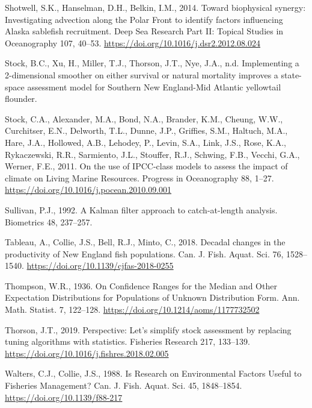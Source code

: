 \documentclass[]{article}
\begin{document}
\leavevmode\hypertarget{ref-shotwell2014Biophysical}{}%
Shotwell, S.K., Hanselman, D.H., Belkin, I.M., 2014. Toward biophysical
synergy: Investigating advection along the Polar Front to identify
factors influencing Alaska sablefish recruitment. Deep Sea Research Part
II: Topical Studies in Oceanography 107, 40--53.
\url{https://doi.org/10.1016/j.dsr2.2012.08.024}

\leavevmode\hypertarget{ref-stockthisissueImplementing}{}%
Stock, B.C., Xu, H., Miller, T.J., Thorson, J.T., Nye, J.A., n.d.
Implementing a 2-dimensional smoother on either survival or natural
mortality improves a state-space assessment model for Southern New
England-Mid Atlantic yellowtail flounder.

\leavevmode\hypertarget{ref-stock2011Use}{}%
Stock, C.A., Alexander, M.A., Bond, N.A., Brander, K.M., Cheung, W.W.,
Curchitser, E.N., Delworth, T.L., Dunne, J.P., Griffies, S.M., Haltuch,
M.A., Hare, J.A., Hollowed, A.B., Lehodey, P., Levin, S.A., Link, J.S.,
Rose, K.A., Rykaczewski, R.R., Sarmiento, J.L., Stouffer, R.J., Schwing,
F.B., Vecchi, G.A., Werner, F.E., 2011. On the use of IPCC-class models
to assess the impact of climate on Living Marine Resources. Progress in
Oceanography 88, 1--27.
\url{https://doi.org/10.1016/j.pocean.2010.09.001}

\leavevmode\hypertarget{ref-sullivan1992Kalman}{}%
Sullivan, P.J., 1992. A Kalman filter approach to catch-at-length
analysis. Biometrics 48, 237--257.

\leavevmode\hypertarget{ref-tableau2018Decadal}{}%
Tableau, A., Collie, J.S., Bell, R.J., Minto, C., 2018. Decadal changes
in the productivity of New England fish populations. Can. J. Fish.
Aquat. Sci. 76, 1528--1540.
\url{https://doi.org/10.1139/cjfas-2018-0255}

\leavevmode\hypertarget{ref-thompson1936Confidence}{}%
Thompson, W.R., 1936. On Confidence Ranges for the Median and Other
Expectation Distributions for Populations of Unknown Distribution Form.
Ann. Math. Statist. 7, 122--128.
\url{https://doi.org/10.1214/aoms/1177732502}

\leavevmode\hypertarget{ref-thorson2019Perspective}{}%
Thorson, J.T., 2019. Perspective: Let's simplify stock assessment by
replacing tuning algorithms with statistics. Fisheries Research 217,
133--139. \url{https://doi.org/10.1016/j.fishres.2018.02.005}

\leavevmode\hypertarget{ref-walters1988Research}{}%
Walters, C.J., Collie, J.S., 1988. Is Research on Environmental Factors
Useful to Fisheries Management? Can. J. Fish. Aquat. Sci. 45,
1848--1854. \url{https://doi.org/10.1139/f88-217}
\end{document}
